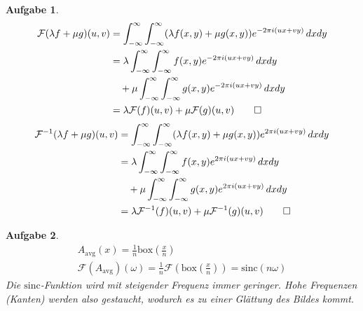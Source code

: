 \documentclass[11pt]{article}
\theoremstyle{break}
\newtheorem{task}{Aufgabe}
\def\fourier{\mathcal{F}}
\def\INT{\int_{-\infty}^{\infty}}
\begin{document}
\begin{task}
    \begin{align*}
        \fourier(\lambda f + \mu g)(u,v) & = \INT\INT (\lambda f(x, y) + \mu g(x, y))e^{-2\pi i(ux + vy)}\, dxdy \\
                                         & = \lambda \INT\INT f(x,y)e^{-2\pi i(ux + vy)}\, dxdy                  \\
                                         & \quad + \mu \INT\INT g(x,y)e^{-2\pi i(ux + vy)}\, dxdy                \\
                                         & = \lambda \fourier(f)(u,v) + \mu \fourier(g)(u,v) \qed
    \end{align*}
    \begin{align*}
        \fourier^{-1}(\lambda f + \mu g)(u,v) & = \INT\INT (\lambda f(x, y) + \mu g(x, y))e^{2\pi i(ux + vy)}\, dxdy \\
                                         & = \lambda \INT\INT f(x,y)e^{2\pi i(ux + vy)}\, dxdy                  \\
                                         & \quad + \mu \INT\INT g(x,y)e^{2\pi i(ux + vy)}\, dxdy                \\
                                         & = \lambda \fourier^{-1}(f)(u,v) + \mu \fourier^{-1}(g)(u,v) \qed
    \end{align*}
\end{task}

\begin{task}
    \begin{gather*}
        A_{\text{avg}}(x) = \frac{1}{n} \text{box}\left(\frac{x}{n}\right)\\
        \fourier(A_{\text{avg}})(\omega) = \frac{1}{n}\fourier\left(\text{box}\left(\frac{x}{n}\right)\right) = \text{sinc}(n\omega)
    \end{gather*}
    Die $\text{sinc}$-Funktion wird mit steigender Frequenz immer geringer. Hohe Frequenzen (Kanten) werden also gestaucht, wodurch es zu einer Glättung des Bildes kommt.
\end{task}
\end{document}
